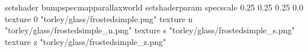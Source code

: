 setshader bumpspecmapparallaxworld
setshaderparam specscale 0.25 0.25 0.25 0.0
texture 0 "torley/glass/frostedsimple.png"
texture n "torley/glass/frostedsimple_n.png"
texture s "torley/glass/frostedsimple_s.png"
texture z "torley/glass/frostedsimple_z.png"

